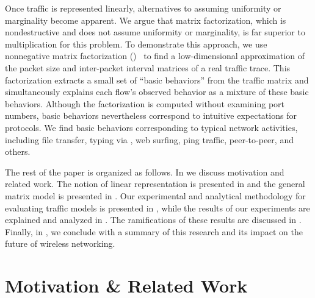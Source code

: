 \documentclass[twocolumn,final]{svjour3}
\begin{document}


Once traffic is represented linearly, alternatives to assuming uniformity or marginality become apparent.
We argue that matrix factorization, which is nondestructive and does not assume uniformity or marginality, is far superior to multiplication for this problem.
To demonstrate this approach, we use nonnegative matrix factorization ()~\cite{Lee01} to find a low-dimensional approximation of the packet size and inter-packet interval matrices of a real traffic trace.
This factorization extracts a small set of ``basic behaviors'' from the traffic matrix and simultaneously explains each flow's observed behavior as a mixture of these basic behaviors.
Although the factorization is computed without examining port numbers, basic behaviors nevertheless correspond to intuitive expectations for protocols.
We find basic behaviors corresponding to typical network activities, including file transfer, typing via , web surfing, ping traffic, peer-to-peer, and others.


The rest of the paper is organized as follows.
In  we discuss motivation and related work.
The notion of linear representation is presented in  and the general matrix model is presented in .
Our experimental and analytical methodology for evaluating traffic models is presented in , while the results of our experiments are explained and analyzed in .
The ramifications of these results are discussed in .
Finally, in , we conclude with a summary of this research and its impact on the future of wireless networking.

\section{Motivation \& Related Work}
\label{sec:related-work}
\label{sec:motivation}

\end{document}
